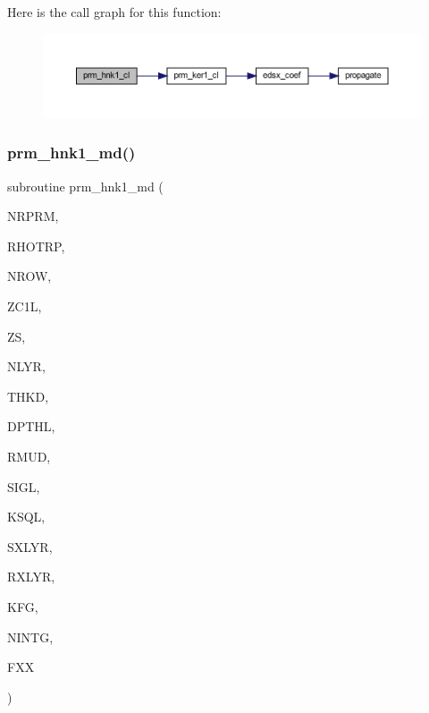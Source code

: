 Here is the call graph for this function\+:\nopagebreak
\begin{figure}[H]
\begin{center}
\leavevmode
\includegraphics[width=350pt]{Leroi__c_8f90_a5285d5a2942c499f6219805b1e689588_cgraph}
\end{center}
\end{figure}
\mbox{\label{Leroi__c_8f90_a90b2b96ee9e9153503bfd5d5bf7d1d0e}} 
\subsubsection{\texorpdfstring{prm\+\_\+hnk1\+\_\+md()}{prm\_hnk1\_md()}}
{\footnotesize\ttfamily subroutine prm\+\_\+hnk1\+\_\+md (\begin{DoxyParamCaption}\item[{integer}]{N\+R\+P\+RM,  }\item[{real, dimension(nrprm)}]{R\+H\+O\+T\+RP,  }\item[{integer}]{N\+R\+OW,  }\item[{real, dimension(nrow)}]{Z\+C1L,  }\item[{real(kind=ql)}]{ZS,  }\item[{integer}]{N\+L\+YR,  }\item[{real(kind=ql), dimension (nlyr)}]{T\+H\+KD,  }\item[{real(kind=ql), dimension (nlyr)}]{D\+P\+T\+HL,  }\item[{real(kind=ql), dimension(0\+:nlyr)}]{R\+M\+UD,  }\item[{complex(kind=ql), dimension (nlyr)}]{S\+I\+GL,  }\item[{complex(kind=ql), dimension (nlyr)}]{K\+S\+QL,  }\item[{integer}]{S\+X\+L\+YR,  }\item[{integer}]{R\+X\+L\+YR,  }\item[{integer}]{K\+FG,  }\item[{integer}]{N\+I\+N\+TG,  }\item[{complex(kind=ql), dimension(nrprm,5,nrow)}]{F\+XX }\end{DoxyParamCaption})}

